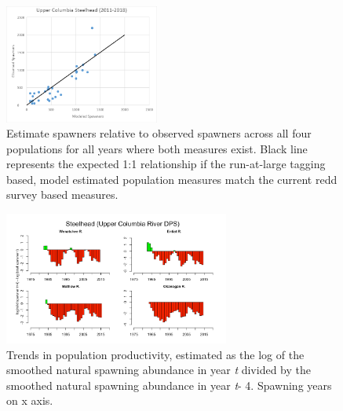 \documentclass[
  letterpaper,
  oneside,
  open=any]{scrbook}
\begin{document}
\begin{figure}

{\centering \includegraphics[width=2in,height=\textheight]{content/Interior_Columbia/../../media/image18.png}

}

\caption{\label{fig-UC-steelhead-one-to-one}Estimate spawners relative
to observed spawners across all four populations for all years where
both measures exist. Black line represents the expected 1:1 relationship
if the run-at-large tagging based, model estimated population measures
match the current redd survey based measures.}

\end{figure}

\begin{figure}

{\centering \includegraphics[width=2.92in,height=\textheight]{content/Interior_Columbia/../../media/image19.png}

}

\caption{\label{fig-UC-Spr-Chinook-productivity-trends}Trends in
population productivity, estimated as the log of the smoothed natural
spawning abundance in year \emph{t} divided by the smoothed natural
spawning abundance in year \emph{t}- 4. Spawning years on x axis.}

\end{figure}
\end{document}

